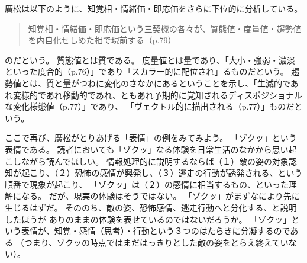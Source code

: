 廣松は以下のように、知覚相・情緒価・即応価をさらに下位的に分析している。
\begin{quote}
  知覚相・情緒価・即応価という三契機の各々が、質態値・度量値・趨勢値を内自化せしめた相で現前する（p.79）
\end{quote}
のだという。
質態値とは質である。
度量値とは量であり、「大小・強弱・濃淡といった度合的（p.76）」であり「スカラー的に配位され」るものだという。
趨勢値とは、質と量がつねに変化のさなかにあるということを示し、「生滅的であれ変様的であれ移動的であれ、ともあれ予期的に覚知されるディスポジショナルな変化様態値（p.77）」であり、
「ヴェクトル的に描出される（p.77）」ものだという。

ここで再び、廣松がとりあげる「表情」の例をみてみよう。
「ゾクッ」という表情である。
読者においても「ゾクッ」なる体験を日常生活のなかから思い起こしながら読んでほしい。
情報処理的に説明するならば（１）敵の姿の対象認知が起こり、（２）恐怖の感情が興発し、（３）逃走の行動が誘発される、という順番で現象が起こり、
「ゾクッ」は（２）の感情に相当するもの、といった理解になる。
だが、現実の体験はそうではない。
「ゾクッ」がまずなにより先に生じるはずだ。
そののち、敵の姿、恐怖感情、逃走行動へと分化する、と説明したほうが
ありのままの体験を表せているのではないだろうか。
「ゾクッ」という表情が、知覚・感情（思考）・行動という３つのはたらきに分凝\cite{hiromatsu:1989}するのである
（つまり、ゾクッの時点ではまだはっきりとした敵の姿をとらえ終えていない）。

